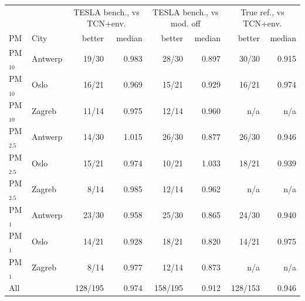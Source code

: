 \begin{tabular}{llrrrrrr}
\toprule
 & & \multicolumn{2}{c}{TESLA bench., vs TCN+env.} & \multicolumn{2}{c}{TESLA bench., vs mod. off} & \multicolumn{2}{c}{True ref., vs TCN+env.} \\
PM & City & better & median & better & median & better & median \\
\midrule
PM$_{10}$ & Antwerp & 19/30 & 0.983 & 28/30 & 0.897 & 30/30 & 0.915 \\
PM$_{10}$ & Oslo & 16/21 & 0.969 & 15/21 & 0.929 & 16/21 & 0.974 \\
PM$_{10}$ & Zagreb & 11/14 & 0.975 & 12/14 & 0.960 & n/a & n/a \\
PM$_{2.5}$ & Antwerp & 14/30 & 1.015 & 26/30 & 0.877 & 26/30 & 0.946 \\
PM$_{2.5}$ & Oslo & 15/21 & 0.974 & 10/21 & 1.033 & 18/21 & 0.939 \\
PM$_{2.5}$ & Zagreb & 8/14 & 0.985 & 12/14 & 0.962 & n/a & n/a \\
PM$_{1}$ & Antwerp & 23/30 & 0.958 & 25/30 & 0.865 & 24/30 & 0.940 \\
PM$_{1}$ & Oslo & 14/21 & 0.928 & 18/21 & 0.820 & 14/21 & 0.975 \\
PM$_{1}$ & Zagreb & 8/14 & 0.977 & 12/14 & 0.873 & n/a & n/a \\
\midrule
All & & 128/195 & 0.974 & 158/195 & 0.912 & 128/153 & 0.946 \\
\bottomrule
\end{tabular}
